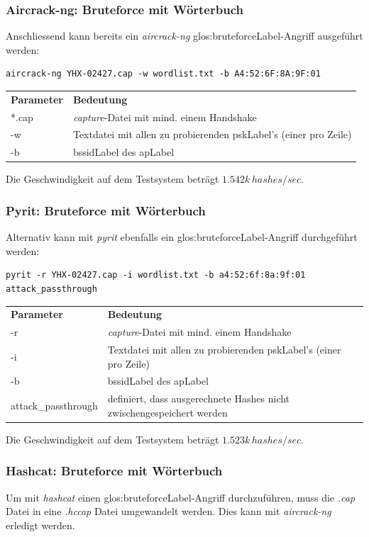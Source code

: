 \subsubsection{Aircrack-ng: Bruteforce mit Wörterbuch}
Anschliessend kann bereits ein \textit{aircrack-ng} \gls{glos:bruteforceLabel}-Angriff ausgeführt werden:
\begin{lstlisting}[style=lstStyleFramed]
aircrack-ng YHX-02427.cap -w wordlist.txt -b A4:52:6F:8A:9F:01
\end{lstlisting}
\begin{tabular}{l l}
	\textbf{Parameter} & \textbf{Bedeutung}\\
	*.cap & \textit{capture}-Datei mit mind. einem Handshake\\
	-w	& Textdatei mit allen zu probierenden \gls{pskLabel}'s (einer pro Zeile)\\
	-b	& \gls{bssidLabel} des \gls{apLabel}\\
\end{tabular}

Die Geschwindigkeit auf dem Testsystem beträgt $1.542k\,hashes/sec$.

\subsubsection{Pyrit: Bruteforce mit Wörterbuch}
Alternativ kann mit \textit{pyrit} ebenfalls ein \gls{glos:bruteforceLabel}-Angriff durchgeführt werden:
\begin{lstlisting}[style=lstStyleFramed]
pyrit -r YHX-02427.cap -i wordlist.txt -b a4:52:6f:8a:9f:01 attack_passthrough
\end{lstlisting}
\begin{tabular}{l l}
	\textbf{Parameter} & \textbf{Bedeutung}\\
	-r & \textit{capture}-Datei mit mind. einem Handshake\\
	-i	& Textdatei mit allen zu probierenden \gls{pskLabel}'s (einer pro Zeile)\\
	-b	& \gls{bssidLabel} des \gls{apLabel}\\
	attack\_passthrough & definiert, dass ausgerechnete Hashes nicht zwischengespeichert werden\\
\end{tabular}

Die Geschwindigkeit auf dem Testsystem beträgt $1.523k\,hashes/sec$.

\subsubsection{Hashcat: Bruteforce mit Wörterbuch}
Um mit \textit{hashcat} einen \gls{glos:bruteforceLabel}-Angriff durchzuführen, muss die \textit{.cap} Datei in eine \textit{.hccap} Datei umgewandelt werden. Dies kann mit \textit{aircrack-ng} erledigt werden.

